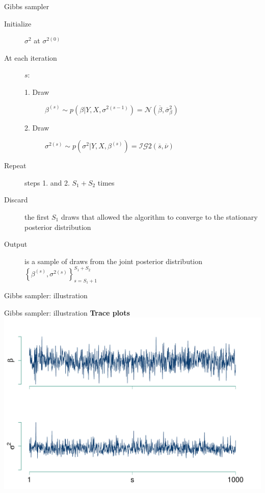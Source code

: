 \documentclass[notes,blackandwhite,mathsans]{beamer}
\begin{document}
\begin{frame}{Gibbs sampler}

\small
\bigskip\begin{description}
\item[Initialize] $\sigma^2$ {\color{mcxs2}at} $\sigma^{2(0)}$
\item[At each iteration] $s$:
\begin{description}
\item[1. Draw] $\beta^{(s)}\sim p\left(\beta|Y,X,\sigma^{2(s-1)}\right) = \mathcal{N}\left(\overline{\beta}, \overline{\sigma}_{\beta}^2\right)$

\smallskip\item[2. Draw] $\sigma^{2(s)}\sim p\left(\sigma^2|Y,X,\beta^{(s)}\right)=\mathcal{IG}2\left( \overline{s}, \overline{\nu} \right)$
\end{description}
\item[Repeat] {\color{mcxs2}steps} 1. {\color{mcxs2}and} 2. $S_1 + S_2$ {\color{mcxs2}times}
\item[Discard] {\color{mcxs2}the first} $S_1$ {\color{mcxs2}draws that allowed the algorithm to} {\color{mcxs3}converge to the stationary posterior distribution}
\item[Output] {\color{mcxs2}is a sample of draws from the joint posterior distribution} $\left\{ \beta^{(s)}, \sigma^{2(s)} \right\}_{s=S_1+1}^{S_1 + S_2}$
\end{description}

\end{frame}





{
\begin{frame}{Gibbs sampler: illustration}
\end{frame}
}




{
\begin{frame}{Gibbs sampler: illustration}
\centering
\textbf{Trace plots}\\
\includegraphics[scale=0.45]{./grphs/bs-trace.pdf}

\end{frame}
}
\end{document}
